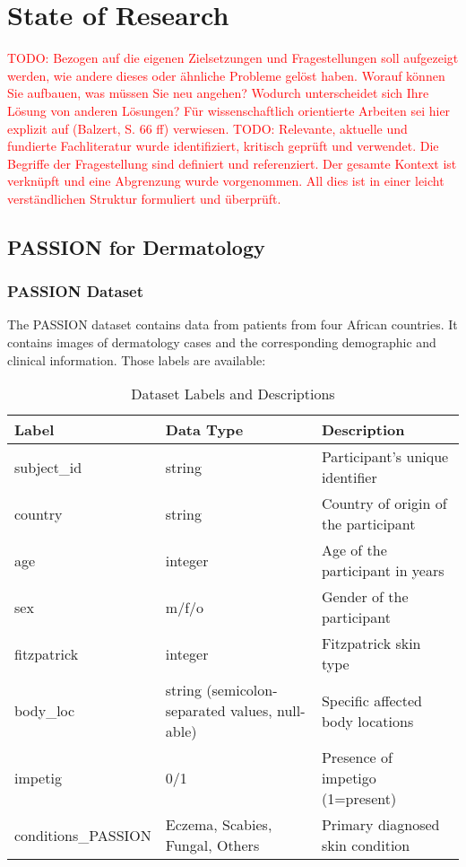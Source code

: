 \documentclass[a4paper,12pt,listof=numbered,toc=chapterentrywithdots]{scrreport}
\renewcommand{\todo}[1]{\textcolor{red}{TODO: #1}}
\begin{document}
	
	\chapter{State of Research}
		\todo{Bezogen auf die eigenen Zielsetzungen und Fragestellungen soll aufgezeigt werden, wie andere dieses oder ähnliche Probleme gelöst haben. Worauf können Sie aufbauen, was müssen Sie neu angehen?	Wodurch unterscheidet sich Ihre Lösung von anderen Lösungen? Für wissenschaftlich orientierte Arbeiten sei hier explizit auf (Balzert, S. 66 ff) verwiesen.}
		\todo{Relevante, aktuelle und fundierte Fachliteratur wurde identifiziert, kritisch geprüft und verwendet. Die Begriffe der Fragestellung sind definiert und referenziert. Der gesamte Kontext ist verknüpft und eine Abgrenzung wurde vorgenommen. All dies ist in einer leicht verständlichen Struktur formuliert und überprüft.}
	
		\section{PASSION for Dermatology}
			\subsection{PASSION Dataset}
			The PASSION dataset contains data from patients from four African countries. It contains images of dermatology cases and the corresponding demographic and clinical information. Those labels are available:
			
			\begin{table}[h!]
				\centering
				\begin{tabular}{@{}|l|p{5cm}|l|@{}}
					\toprule
					\textbf{Label}       & \textbf{Data Type} & \textbf{Description}       \\ \midrule
					subject\_id          & string & Participant's unique identifier        \\
					country              & string & Country of origin of the participant   \\
					age                  & integer & Age of the participant in years       \\
					sex                  & m/f/o & Gender of the participant \\
					fitzpatrick          & integer & Fitzpatrick skin type \\
					body\_loc            & string (semicolon-separated values, null-able) & Specific affected body locations \\
					impetig              & 0/1  & Presence of impetigo (1=present)    \\
					conditions\_PASSION  & Eczema, Scabies, Fungal, Others & Primary diagnosed skin condition \\
					\bottomrule
				\end{tabular}
				\caption{Dataset Labels and Descriptions}
				\label{tab:labels}
			\end{table}
			
\end{document}
